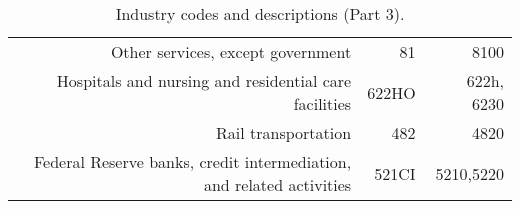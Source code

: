 \begin{table}[H]
\begin{center}
\begin{tabular}{rrr}
Other services, except government                                    & 81          & 8100      \\%
Hospitals and nursing and residential care facilities                & 622HO       & 622h, 6230\\%
Rail transportation                                                  & 482         & 4820      \\%
Federal Reserve banks, credit intermediation, and related activities & 521CI       & 5210,5220 \\%
\hline\hline
\end{tabular}
\end{center}
\caption{\label{tab:industries_3}Industry codes and descriptions (Part 3).}
\end{table}
